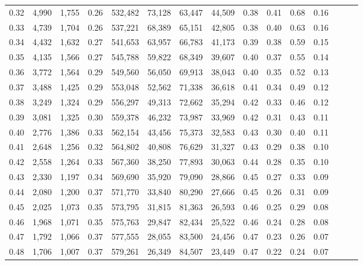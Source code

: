 \begin{tabular}{rrrrrrrrrrrrrrr}
0.32 &   4,990 &  1,755 &  0.26 &  532,482 &   73,128 &   63,447 &   44,509 &  0.38 &  0.41 &  0.68 &      0.16 \\
0.33 &   4,739 &  1,704 &  0.26 &  537,221 &   68,389 &   65,151 &   42,805 &  0.38 &  0.40 &  0.63 &      0.16 \\
0.34 &   4,432 &  1,632 &  0.27 &  541,653 &   63,957 &   66,783 &   41,173 &  0.39 &  0.38 &  0.59 &      0.15 \\
0.35 &   4,135 &  1,566 &  0.27 &  545,788 &   59,822 &   68,349 &   39,607 &  0.40 &  0.37 &  0.55 &      0.14 \\
0.36 &   3,772 &  1,564 &  0.29 &  549,560 &   56,050 &   69,913 &   38,043 &  0.40 &  0.35 &  0.52 &      0.13 \\
0.37 &   3,488 &  1,425 &  0.29 &  553,048 &   52,562 &   71,338 &   36,618 &  0.41 &  0.34 &  0.49 &      0.12 \\
0.38 &   3,249 &  1,324 &  0.29 &  556,297 &   49,313 &   72,662 &   35,294 &  0.42 &  0.33 &  0.46 &      0.12 \\
0.39 &   3,081 &  1,325 &  0.30 &  559,378 &   46,232 &   73,987 &   33,969 &  0.42 &  0.31 &  0.43 &      0.11 \\
0.40 &   2,776 &  1,386 &  0.33 &  562,154 &   43,456 &   75,373 &   32,583 &  0.43 &  0.30 &  0.40 &      0.11 \\
0.41 &   2,648 &  1,256 &  0.32 &  564,802 &   40,808 &   76,629 &   31,327 &  0.43 &  0.29 &  0.38 &      0.10 \\
0.42 &   2,558 &  1,264 &  0.33 &  567,360 &   38,250 &   77,893 &   30,063 &  0.44 &  0.28 &  0.35 &      0.10 \\
0.43 &   2,330 &  1,197 &  0.34 &  569,690 &   35,920 &   79,090 &   28,866 &  0.45 &  0.27 &  0.33 &      0.09 \\
0.44 &   2,080 &  1,200 &  0.37 &  571,770 &   33,840 &   80,290 &   27,666 &  0.45 &  0.26 &  0.31 &      0.09 \\
0.45 &   2,025 &  1,073 &  0.35 &  573,795 &   31,815 &   81,363 &   26,593 &  0.46 &  0.25 &  0.29 &      0.08 \\
0.46 &   1,968 &  1,071 &  0.35 &  575,763 &   29,847 &   82,434 &   25,522 &  0.46 &  0.24 &  0.28 &      0.08 \\
0.47 &   1,792 &  1,066 &  0.37 &  577,555 &   28,055 &   83,500 &   24,456 &  0.47 &  0.23 &  0.26 &      0.07 \\
0.48 &   1,706 &  1,007 &  0.37 &  579,261 &   26,349 &   84,507 &   23,449 &  0.47 &  0.22 &  0.24 &      0.07 \\

\end{tabular}
